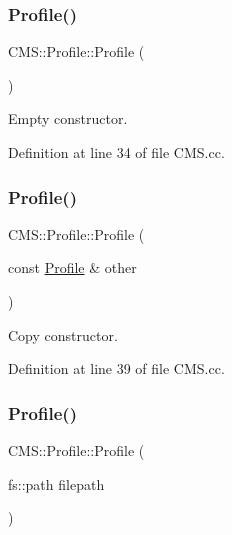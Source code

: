 \subsubsection{\texorpdfstring{Profile()}{Profile()}\hspace{0.1cm}{\footnotesize\ttfamily [1/5]}}
{\footnotesize\ttfamily C\+M\+S\+::\+Profile\+::\+Profile (\begin{DoxyParamCaption}{ }\end{DoxyParamCaption})}



Empty constructor. 



Definition at line 34 of file C\+M\+S.\+cc.

\mbox{\label{class_c_m_s_1_1_profile_a46a702357e409603a511d93d55d02367}} 
\subsubsection{\texorpdfstring{Profile()}{Profile()}\hspace{0.1cm}{\footnotesize\ttfamily [2/5]}}
{\footnotesize\ttfamily C\+M\+S\+::\+Profile\+::\+Profile (\begin{DoxyParamCaption}\item[{const \hyperlink{class_c_m_s_1_1_profile}{Profile} \&}]{other }\end{DoxyParamCaption})}



Copy constructor. 



Definition at line 39 of file C\+M\+S.\+cc.

\mbox{\label{class_c_m_s_1_1_profile_a53c301fecda6950999e2f87e1280cd8a}} 
\subsubsection{\texorpdfstring{Profile()}{Profile()}\hspace{0.1cm}{\footnotesize\ttfamily [3/5]}}
{\footnotesize\ttfamily C\+M\+S\+::\+Profile\+::\+Profile (\begin{DoxyParamCaption}\item[{fs\+::path}]{filepath }\end{DoxyParamCaption})}



